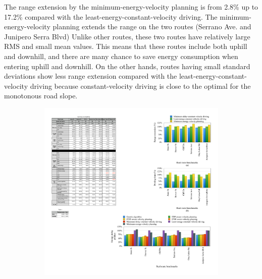 \documentclass{IEEEtran}
\begin{document}
The range extension by the minimum-energy-velocity planning is from 2.8\% up to 17.2\% compared with the least-energy-constant-velocity driving. 
The minimum-energy-velocity planning extends the range on the two routes (Serrano Ave. and Junipero Serra Blvd) Unlike other routes, these two routes have relatively large RMS and small mean values. This means that these routes include both uphill and downhill, and there are many chance to save energy consumption when entering uphill and downhill. 
On the other hands, routes having small standard deviations show less range extension compared with the least-energy-constant-velocity driving because constant-velocity driving is close to the optimal for the monotonous road slope.


\begin{figure}   %
\centering
	\begin{subfigure}{0.47\textwidth}
	\includegraphics[width=\hsize]{Figures/range_comp_bar.pdf}
	\caption{}
	\label{fig:range_comp}
	\end{subfigure}
~
	\begin{subfigure}{0.47\textwidth}

\end{subfigure}
\end{figure}
\end{document}
